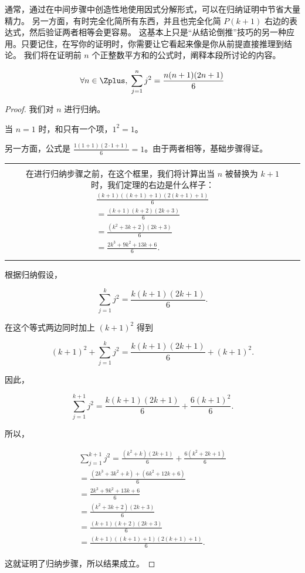 通常，通过在中间步骤中创造性地使用因式分解形式，可以在归纳证明中节省大量精力。
另一方面，有时完全化简所有东西，并且也完全化简 $P(k+1)$ 右边的表达式，然后验证两者相等会更容易。
这基本上只是“从结论倒推”技巧的另一种应用。只要记住，在写你的证明时，你需要让它看起来像是你从前提直接推理到结论。
我们将在证明前 $n$ 个正整数平方和的公式时，阐释本段所讨论的内容。
\begin{thm}
\[ \forall n \in \Zplus, \; \sum_{j=1}^n j^2 = \frac{n(n+1)(2n+1)}{6} \]
\end{thm}

\begin{proof}
我们对 $n$ 进行归纳。

当 $n = 1$ 时，和只有一个项，$1^2 = 1$。

另一方面，公式是 $\displaystyle \frac{1(1+1)(2\cdot 1+1)}{6} = 1$。由于两者相等，基础步骤得证。


\begin{tabular}{|ccc|} \hline
 & &\\
 & \begin{minipage}{4 in} 
在进行归纳步骤之前，在这个框里，我们将计算出当 $n$ 被替换为 $k+1$ 时，我们定理的右边是什么样子：
\begin{gather*}
 \frac{(k+1)((k+1)+1)(2(k+1)+1)}{6} \\
= \frac{(k+1)(k+2)(2k+3)}{6} \\
= \frac{(k^2+3k+2)(2k+3)}{6} \\
= \frac{2k^3+9k^2+13k+6}{6}.
\end{gather*}
\end{minipage} & \\ 
 & & \\ \hline
\end{tabular}

根据归纳假设，

\[ \sum_{j=1}^k j^2 = \frac{k(k+1)(2k+1)}{6}.
\]

在这个等式两边同时加上 $(k+1)^2$ 得到

\[ (k+1)^2 + \sum_{j=1}^k j^2 = \frac{k(k+1)(2k+1)}{6} + (k+1)^2.
\]

因此，

\[ \sum_{j=1}^{k+1} j^2 = \frac{k(k+1)(2k+1)}{6} + \frac{6(k+1)^2}{6}. \]

所以，

\begin{gather*}
\sum_{j=1}^{k+1} j^2 = \frac{(k^2+k)(2k+1)}{6} + \frac{6(k^2+2k+1)}{6} \\
 = \frac{(2k^3+3k^2+k)+(6k^2+12k+6)}{6}\\
 = \frac{2k^3+9k^2+13k+6}{6}\\
 = \frac{(k^2+3k+2)(2k+3)}{6}\\
 = \frac{(k+1)(k+2)(2k+3)}{6} \\
 = \frac{(k+1)((k+1)+1)(2(k+1)+1)}{6}.
\end{gather*}

这就证明了归纳步骤，所以结果成立。
\end{proof}

